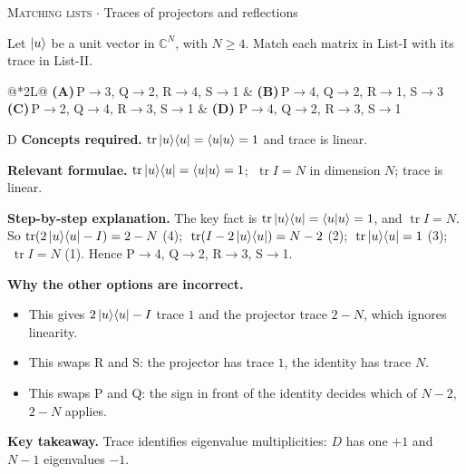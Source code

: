 \documentclass[11pt,a4paper]{article}
\newcommand{\optlabel}[1]{\textbf{(#1)}}
\newcommand{\correctlabel}[1]{\textcolor{okgreen}{\textbf{(#1)}\,\ding{51}}}
\newenvironment{qitem}[1]{\begin{list}{}{\setlength{\leftmargin}{3.3em}\setlength{\labelwidth}{3.1em}%
  \setlength{\labelsep}{0.2em}\setlength{\topsep}{3pt}\setlength{\parsep}{3pt}}\item[\textbf{Q.#1}\hfill]}{\end{list}}
\newcommand{\qmeta}[2]{{\footnotesize\color{black!60}\textsc{#1} \;$\cdot$\; #2}\par}
\begin{document}
\begin{qitem}{16}
\qmeta{Matching lists}{Traces of projectors and reflections}
Let $\ket{u}$ be a unit vector in $\mathbb{C}^{N}$, with $N \ge 4$. Match each matrix in List-I with its trace in List-II.
\par\smallskip{}
\par\smallskip\noindent\begin{tabularx}{\linewidth}{@{}*{2}{L}@{}}
\optlabel{A}\,P$\to$3, Q$\to$2, R$\to$4, S$\to$1 & \optlabel{B}\,P$\to$4, Q$\to$2, R$\to$1, S$\to$3 \\[3pt]
\optlabel{C}\,P$\to$2, Q$\to$4, R$\to$3, S$\to$1 & \correctlabel{D}\,P$\to$4, Q$\to$2, R$\to$3, S$\to$1
\end{tabularx}
\end{qitem}
\begin{solbox}{D}
\textbf{\color{brand}Concepts required.} $\operatorname{tr}\ket{u}\!\bra{u} = \braket{u|u} = 1$ and trace is linear.

\textbf{\color{brand}Relevant formulae.} $\operatorname{tr}\ket{u}\!\bra{u} = \braket{u|u} = 1$; $\;\operatorname{tr}I = N$ in dimension $N$; trace is linear.

\textbf{\color{brand}Step-by-step explanation.} The key fact is $\operatorname{tr}\ket{u}\!\bra{u} = \braket{u|u} = 1$, and $\operatorname{tr} I = N$. So
$\operatorname{tr}(2\ket{u}\!\bra{u} - I) = 2 - N$ (4); $\;\operatorname{tr}(I - 2\ket{u}\!\bra{u}) = N - 2$ (2); $\;\operatorname{tr}\ket{u}\!\bra{u} = 1$ (3);
$\;\operatorname{tr} I = N$ (1). Hence P$\to$4, Q$\to$2, R$\to$3, S$\to$1.

\textbf{\color{brand}Why the other options are incorrect.}
\begin{itemize}[leftmargin=2.4em, itemsep=1pt, topsep=2pt]
\item[\textbf{(A)}] This gives $2\ket{u}\!\bra{u} - I$ trace $1$ and the projector trace $2 - N$, which ignores linearity.
\item[\textbf{(B)}] This swaps R and S: the projector has trace $1$, the identity has trace $N$.
\item[\textbf{(C)}] This swaps P and Q: the sign in front of the identity decides which of $N - 2$, $2 - N$ applies.
\end{itemize}
\textbf{\color{brand}Key takeaway.} Trace identifies eigenvalue multiplicities: $D$ has one $+1$ and $N - 1$ eigenvalues $-1$.
\end{solbox}
\end{document}
